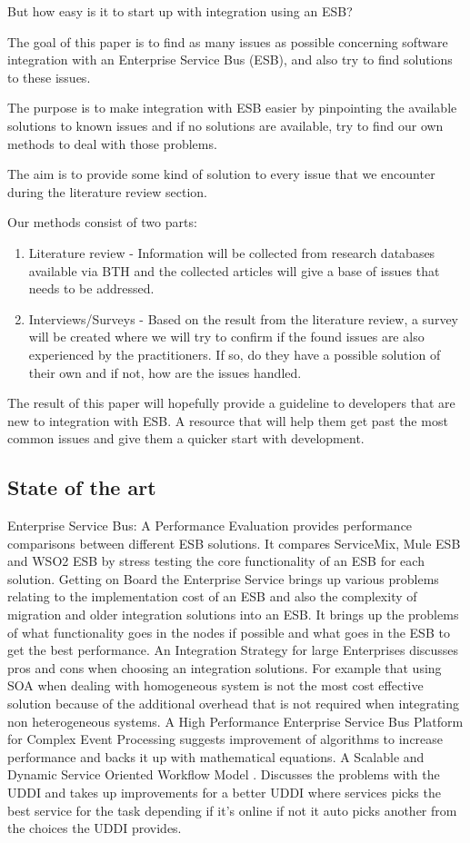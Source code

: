\documentclass{llncs}
\begin{document}
But how easy is it to start up with integration using an ESB?

The goal of this paper is to find as many  issues as possible concerning software integration with an Enterprise Service Bus (ESB), and also try to find solutions to these issues.

The purpose is to make integration with ESB easier by pinpointing the available solutions to known issues and if no solutions are available, try to find our own methods to deal with those problems.

The aim is to provide some kind of solution to every issue that we encounter during the literature review section.

Our methods consist of two parts:
\begin{enumerate}
 \item Literature review - Information will be collected from research databases available via BTH and the collected articles will give a base of issues that needs to be addressed.
 \item Interviews/Surveys - Based on the result from the literature review, a survey will be created where we will try to confirm if the found issues are also experienced by the practitioners. If so, do they have a possible solution of their own and if not, how are the issues handled.
\end{enumerate}
The result of this paper will hopefully provide a guideline to developers that are new to integration with ESB. A resource that will help them get past the most common issues and give them a quicker start with development.


\subsection{State of the art}

Enterprise Service Bus: A Performance Evaluation \cite{sanjay11} provides performance comparisons between different ESB solutions. It compares ServiceMix\cite{servicemix}, Mule ESB\cite{mule} and WSO2 ESB\cite{wso2} by stress testing the core functionality of an ESB for each solution. Getting on Board the Enterprise Service \cite{ortiz07} brings up various problems relating to the implementation cost of an ESB and also the complexity of migration and older integration solutions into an ESB. It brings up the problems of what functionality goes in the nodes if possible and what goes in the ESB to get the best performance. An Integration Strategy for large Enterprises \cite{risimic06} discusses pros and cons when choosing an integration solutions. For example that using SOA when dealing with homogeneous system is not the most cost effective solution because of the additional overhead that is not required when integrating non heterogeneous systems. A High Performance Enterprise Service Bus Platform for Complex Event Processing \cite{bo08} suggests improvement of algorithms to increase performance and backs it up with mathematical equations. A Scalable and Dynamic Service Oriented Workflow Model \cite{yang11}. Discusses the problems with the UDDI and takes up improvements for a better UDDI where services picks the best service for the task depending if it’s online if not it auto picks another from the choices the UDDI provides. 
\end{document}
